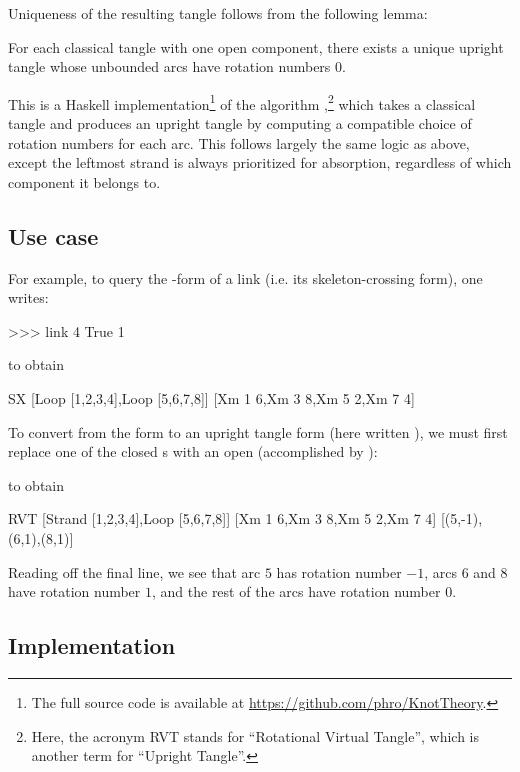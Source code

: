 Uniqueness of the resulting tangle follows from the following lemma:
\begin{lemma}
        For each classical tangle with one open component, there exists a unique
        upright tangle whose unbounded arcs have rotation numbers $0$.
\end{lemma}

This is a Haskell implementation\footnote{The full source code is available at
\url{https://github.com/phro/KnotTheory}.} of the algorithm ,\footnote{Here, the
acronym RVT stands for \enquote{Rotational Virtual Tangle}, which is
another term for \enquote{Upright Tangle}.} which takes a classical tangle and
produces an upright tangle by computing a compatible choice of rotation numbers
for each arc. This follows largely the same logic as above, except the leftmost
strand is always prioritized for absorption, regardless of which component it
belongs to.

\subsection{Use case}

For example, to query the -form of a link (i.e. its skeleton-crossing
form), one writes:
\begin{code}
>>> link 4 True 1
\end{code}
to obtain
\begin{code}
SX [Loop [1,2,3,4],Loop [5,6,7,8]]
   [Xm 1 6,Xm 3 8,Xm 5 2,Xm 7 4]
\end{code}
To convert from the  form to an upright tangle form (here written
), we must first replace one of the closed s with an open
 (accomplished by ):
to obtain
\begin{code}
RVT [Strand [1,2,3,4],Loop [5,6,7,8]]
    [Xm 1 6,Xm 3 8,Xm 5 2,Xm 7 4]
    [(5,-1),(6,1),(8,1)]
\end{code}
Reading off the final line, we see that arc $5$ has rotation number $-1$, arcs
$6$ and $8$ have rotation number $1$, and the rest of the arcs have rotation
number $0$.

\subsection{Implementation}


